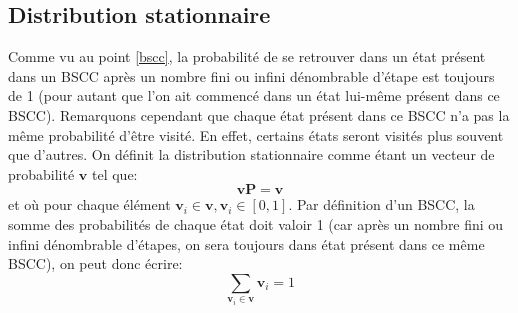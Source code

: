 \documentclass[letterpaper]{article}
\begin{document}
  \subsection{Distribution stationnaire}
    \label{distribution_stationnaire}
    Comme vu au point \ref{bscc}, la probabilité de se retrouver dans un état
    présent dans un BSCC après un nombre fini ou infini dénombrable d'étape est
    toujours de 1 (pour autant que l'on ait commencé dans un état lui-même présent
    dans ce BSCC).  Remarquons cependant que chaque état présent dans ce BSCC n'a
    pas la même probabilité d'être visité.  En effet, certains états seront
    visités plus souvent que d'autres.
    On définit la distribution stationnaire comme étant un vecteur de probabilité
    $\mathbf{v}$ tel que:
    $$\mathbf{v}\mathbf{P} = \mathbf{v}$$
    et où pour chaque élément $\mathbf{v}_i \in \mathbf{v}, \mathbf{v}_i \in [0, 1]$.
    Par définition d'un BSCC, la somme des probabilités de chaque état doit valoir 1
    (car après un nombre fini ou infini dénombrable d'étapes, on sera toujours dans
    état présent dans ce même BSCC), on peut donc écrire:
    $$\sum\limits_{\mathbf{v}_i \in \mathbf{v}} \mathbf{v}_i = 1$$
\end{document}
